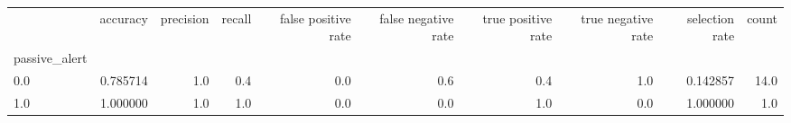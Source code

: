 \begin{tabular}{lrrrrrrrrr}
\toprule
{} &  accuracy &  precision &  recall &  false positive rate &  false negative rate &  true positive rate &  true negative rate &  selection rate &  count \\
passive\_alert &           &            &         &                      &                      &                     &                     &                 &        \\
\midrule
0.0           &  0.785714 &        1.0 &     0.4 &                  0.0 &                  0.6 &                 0.4 &                 1.0 &        0.142857 &   14.0 \\
1.0           &  1.000000 &        1.0 &     1.0 &                  0.0 &                  0.0 &                 1.0 &                 0.0 &        1.000000 &    1.0 \\
\bottomrule
\end{tabular}
